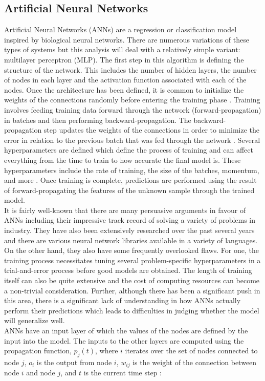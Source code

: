 \documentclass[titlepage]{article}
\begin{document}
\subsection{Artificial Neural Networks}
Artificial Neural Networks (ANNs) are a regression or classification model inspired by biological neural networks. There are numerous variations of these types of systems but this analysis will deal with a relatively simple variant: multilayer perceptron (MLP). The first step in this algorithm is defining the structure of the network. This includes the number of hidden layers, the number of nodes in each layer and the activation function associated with each of the nodes. Once the architecture has been defined, it is common to initialize the weights of the connections randomly before entering the training phase \cite{AnnInit}. Training involves feeding training data forward through the network (forward-propagation) in batches and then performing backward-propagation. The backward-propagation step updates the weights of the connections in order to minimize the error in relation to the previous batch that was fed through the network \cite{AnnSpec}. Several hyperparameters are defined which define the process of training and can affect everything from the time to train to how accurate the final model is. These hyperparameters include the rate of training, the size of the batches, momentum, and more \cite{AnnSpec}. Once training is complete, predictions are performed using the result of forward-propagating the features of the unknown sample through the trained model.\\
It is fairly well-known that there are many persuasive arguments in favour of ANNs including their impressive track record of solving a variety of problems in industry. They have also been extensively researched over the past several years and there are various neural network libraries available in a variety of languages. On the other hand, they also have some frequently overlooked flaws. For one, the training process necessitates tuning several problem-specific hyperparameters in a trial-and-error process before good models are obtained. The length of training itself can also be quite extensive and the cost of computing resources can become a non-trivial consideration. Further, although there has been a significant push in this area, there is a significant lack of understanding in how ANNs actually perform their predictions which leads to difficulties in judging whether the model will generalize well.\\
ANNs have an input layer of which the values of the nodes are defined by the input into the model. The inputs to the other layers are computed using the propagation function, $p_j(t)$, where $i$ iterates over the set of nodes connected to node $j$, $o_i$ is the output from node $i$, $w_{ij}$ is the weight of the connection between node $i$ and node $j$, and $t$ is the current time step \cite{AnnMath}:
\end{document}
